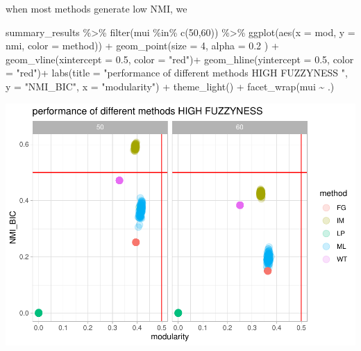 \documentclass[
]{article}
\newenvironment{Shaded}{\begin{snugshade}}{\end{snugshade}}
\newcommand{\AttributeTok}[1]{\textcolor[rgb]{0.77,0.63,0.00}{#1}}
\newcommand{\DecValTok}[1]{\textcolor[rgb]{0.00,0.00,0.81}{#1}}
\newcommand{\FloatTok}[1]{\textcolor[rgb]{0.00,0.00,0.81}{#1}}
\newcommand{\FunctionTok}[1]{\textcolor[rgb]{0.00,0.00,0.00}{#1}}
\newcommand{\NormalTok}[1]{#1}
\newcommand{\SpecialCharTok}[1]{\textcolor[rgb]{0.00,0.00,0.00}{#1}}
\newcommand{\StringTok}[1]{\textcolor[rgb]{0.31,0.60,0.02}{#1}}
\begin{document}
when most methods generate low NMI, we

\begin{Shaded}
\begin{Highlighting}[]
\NormalTok{summary\_results }\SpecialCharTok{\%\textgreater{}\%} 
  \FunctionTok{filter}\NormalTok{(mui }\SpecialCharTok{\%in\%} \FunctionTok{c}\NormalTok{(}\DecValTok{50}\NormalTok{,}\DecValTok{60}\NormalTok{)) }\SpecialCharTok{\%\textgreater{}\%} 
  \FunctionTok{ggplot}\NormalTok{(}\FunctionTok{aes}\NormalTok{(}\AttributeTok{x =}\NormalTok{ mod, }\AttributeTok{y =}\NormalTok{ nmi, }\AttributeTok{color =}\NormalTok{ method)) }\SpecialCharTok{+}
  \FunctionTok{geom\_point}\NormalTok{(}\AttributeTok{size =} \DecValTok{4}\NormalTok{, }\AttributeTok{alpha =} \FloatTok{0.2}\NormalTok{ ) }\SpecialCharTok{+}
  \FunctionTok{geom\_vline}\NormalTok{(}\AttributeTok{xintercept =} \FloatTok{0.5}\NormalTok{, }\AttributeTok{color =} \StringTok{"red"}\NormalTok{)}\SpecialCharTok{+}
  \FunctionTok{geom\_hline}\NormalTok{(}\AttributeTok{yintercept =} \FloatTok{0.5}\NormalTok{, }\AttributeTok{color =} \StringTok{"red"}\NormalTok{)}\SpecialCharTok{+}
  \FunctionTok{labs}\NormalTok{(}\AttributeTok{title =} \StringTok{"performance of different methods HIGH FUZZYNESS "}\NormalTok{, }\AttributeTok{y =} \StringTok{"NMI\_BIC"}\NormalTok{, }\AttributeTok{x =} \StringTok{"modularity"}\NormalTok{) }\SpecialCharTok{+}
  \FunctionTok{theme\_light}\NormalTok{()  }\SpecialCharTok{+} \FunctionTok{facet\_wrap}\NormalTok{(mui }\SpecialCharTok{\textasciitilde{}}\NormalTok{ .)}
\end{Highlighting}
\end{Shaded}

\includegraphics{com_det_algorithms_files/figure-latex/unnamed-chunk-19-1.pdf}
\end{document}
